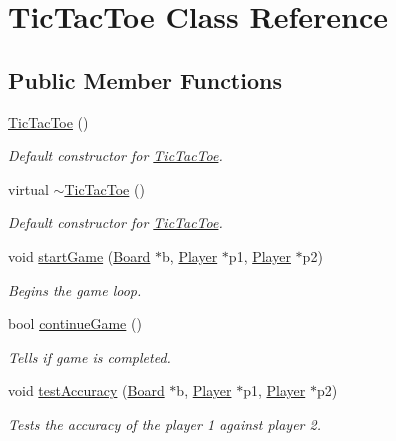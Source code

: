 \hypertarget{classTicTacToe}{}\section{Tic\+Tac\+Toe Class Reference}
\label{classTicTacToe}
\subsection*{Public Member Functions}
\begin{DoxyCompactItemize}
\item 
\mbox{\label{classTicTacToe_a103fe9a5ae41b5ef756e20594a70cb7a}} 
\mbox{\hyperlink{classTicTacToe_a103fe9a5ae41b5ef756e20594a70cb7a}{Tic\+Tac\+Toe}} ()
\begin{DoxyCompactList}\small\item\em Default constructor for \mbox{\hyperlink{classTicTacToe}{Tic\+Tac\+Toe}}. \end{DoxyCompactList}\item 
\mbox{\label{classTicTacToe_a5e9c4ed3279034d5530cc7b94a3e10e5}} 
virtual \mbox{\hyperlink{classTicTacToe_a5e9c4ed3279034d5530cc7b94a3e10e5}{$\sim$\+Tic\+Tac\+Toe}} ()
\begin{DoxyCompactList}\small\item\em Default constructor for \mbox{\hyperlink{classTicTacToe}{Tic\+Tac\+Toe}}. \end{DoxyCompactList}\item 
void \mbox{\hyperlink{classTicTacToe_afe9570245c1c941777a7bd367ee10e61}{start\+Game}} (\mbox{\hyperlink{classBoard}{Board}} $\ast$b, \mbox{\hyperlink{classPlayer}{Player}} $\ast$p1, \mbox{\hyperlink{classPlayer}{Player}} $\ast$p2)
\begin{DoxyCompactList}\small\item\em Begins the game loop. \end{DoxyCompactList}\item 
bool \mbox{\hyperlink{classTicTacToe_a866e38e3280ef65ae6f43473cc4e0532}{continue\+Game}} ()
\begin{DoxyCompactList}\small\item\em Tells if game is completed. \end{DoxyCompactList}\item 
void \mbox{\hyperlink{classTicTacToe_acf8b3808738ec3ec154f8f75643fbc7c}{test\+Accuracy}} (\mbox{\hyperlink{classBoard}{Board}} $\ast$b, \mbox{\hyperlink{classPlayer}{Player}} $\ast$p1, \mbox{\hyperlink{classPlayer}{Player}} $\ast$p2)
\begin{DoxyCompactList}\small\item\em Tests the accuracy of the player 1 against player 2. \end{DoxyCompactList}\end{DoxyCompactItemize}
